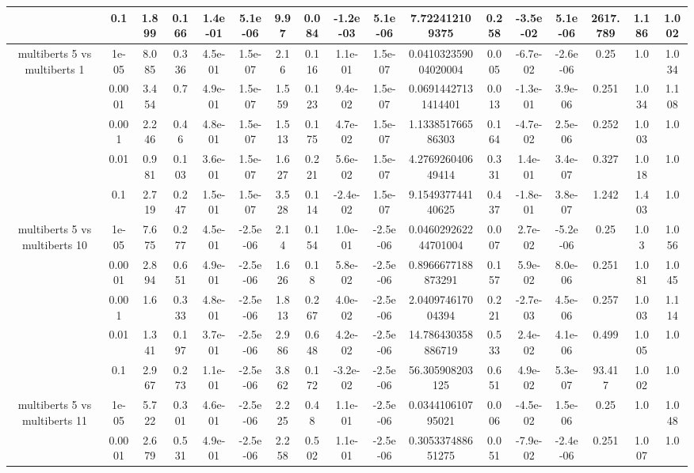 \begin{tabular}{|c|c|c|c|c|c|c|c|c|c|c|c|c|c|c|c|c|}
 & 0.1 & 1.899 & 0.166 & 1.4e-01 & 5.1e-06 & 9.97 & 0.084 & -1.2e-03 & 5.1e-06 & 7.722412109375 & 0.258 & -3.5e-02 & 5.1e-06 & 2617.789 & 1.186 & 1.002 \\
\hline
\multirow{5}{*}{multiberts 5 vs multiberts 1} & 1e-05 & 8.085 & 0.336 & 4.5e-01 & 1.5e-07 & 2.16 & 0.116 & 1.1e-01 & 1.5e-07 & 0.041032359004020004 & 0.005 & -6.7e-02 & -2.6e-06 & 0.25 & 1.0 & 1.034 \\
 & 0.0001 & 3.454 & 0.7 & 4.9e-01 & 1.5e-07 & 1.559 & 0.123 & 9.4e-02 & 1.5e-07 & 0.06914427131414401 & 0.013 & -1.3e-01 & 3.9e-06 & 0.251 & 1.034 & 1.108 \\
 & 0.001 & 2.246 & 0.46 & 4.8e-01 & 1.5e-07 & 1.513 & 0.175 & 4.7e-02 & 1.5e-07 & 1.133851766586303 & 0.164 & -4.7e-02 & 2.5e-06 & 0.252 & 1.003 & 1.0 \\
 & 0.01 & 0.981 & 0.103 & 3.6e-01 & 1.5e-07 & 1.627 & 0.221 & 5.6e-02 & 1.5e-07 & 4.276926040649414 & 0.331 & 1.4e-01 & 3.4e-07 & 0.327 & 1.018 & 1.0 \\
 & 0.1 & 2.719 & 0.247 & 1.5e-01 & 1.5e-07 & 3.528 & 0.114 & -2.4e-02 & 1.5e-07 & 9.154937744140625 & 0.437 & -1.8e-01 & 3.8e-07 & 1.242 & 1.403 & 1.0 \\
\hline
\multirow{5}{*}{multiberts 5 vs multiberts 10} & 1e-05 & 7.675 & 0.277 & 4.5e-01 & -2.5e-06 & 2.14 & 0.154 & 1.0e-01 & -2.5e-06 & 0.046029262244701004 & 0.007 & 2.7e-02 & -5.2e-06 & 0.25 & 1.03 & 1.056 \\
 & 0.0001 & 2.894 & 0.651 & 4.9e-01 & -2.5e-06 & 1.626 & 0.18 & 5.8e-02 & -2.5e-06 & 0.8966677188873291 & 0.157 & 5.9e-02 & 8.0e-06 & 0.251 & 1.081 & 1.045 \\
 & 0.001 & 1.6 & 0.333 & 4.8e-01 & -2.5e-06 & 1.813 & 0.267 & 4.0e-02 & -2.5e-06 & 2.040974617004394 & 0.221 & -2.7e-03 & 4.5e-06 & 0.257 & 1.003 & 1.114 \\
 & 0.01 & 1.341 & 0.197 & 3.7e-01 & -2.5e-06 & 2.986 & 0.648 & 4.2e-02 & -2.5e-06 & 14.786430358886719 & 0.533 & 2.4e-02 & 4.1e-06 & 0.499 & 1.005 & 1.0 \\
 & 0.1 & 2.967 & 0.273 & 1.1e-01 & -2.5e-06 & 3.862 & 0.172 & -3.2e-02 & -2.5e-06 & 56.305908203125 & 0.651 & 4.9e-02 & 5.3e-07 & 93.417 & 1.002 & 1.0 \\
\hline
\multirow{5}{*}{multiberts 5 vs multiberts 11} & 1e-05 & 5.722 & 0.301 & 4.6e-01 & -2.5e-06 & 2.225 & 0.48 & 1.1e-01 & -2.5e-06 & 0.034410610795021 & 0.006 & -4.5e-02 & 1.5e-06 & 0.25 & 1.0 & 1.048 \\
 & 0.0001 & 2.679 & 0.531 & 4.9e-01 & -2.5e-06 & 2.258 & 0.502 & 1.1e-01 & -2.5e-06 & 0.305337488651275 & 0.051 & -7.9e-02 & -2.4e-06 & 0.251 & 1.007 & 1.0 \\

\end{tabular}
